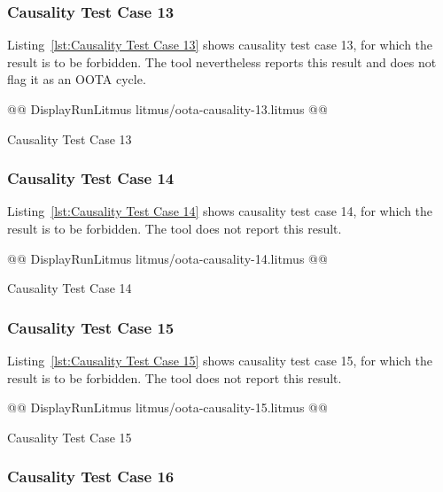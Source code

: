 \documentclass[10]{article}
\begin{document}
\subsubsection{Causality Test Case 13}
\label{app:Causality Test Case 13}

Listing~\ref{lst:Causality Test Case 13}
shows causality test case 13, for which the 
result is to be forbidden.
The  tool nevertheless reports this result and does not flag it as
an OOTA cycle.

\begin{listing}[tbp]
@@ DisplayRunLitmus litmus/oota-causality-13.litmus @@
\caption{Causality Test Case 13}
\label{lst:Causality Test Case 13}
\end{listing}

\subsubsection{Causality Test Case 14}
\label{app:Causality Test Case 14}

Listing~\ref{lst:Causality Test Case 14}
shows causality test case 14, for which the 
result is to be forbidden.
The  tool does not report this result.

\begin{listing}[tbp]
@@ DisplayRunLitmus litmus/oota-causality-14.litmus @@
\caption{Causality Test Case 14}
\label{lst:Causality Test Case 14}
\end{listing}

\subsubsection{Causality Test Case 15}
\label{app:Causality Test Case 15}

Listing~\ref{lst:Causality Test Case 15}
shows causality test case 15, for which the 
result is to be forbidden.
The  tool does not report this result.

\begin{listing}[tbp]
@@ DisplayRunLitmus litmus/oota-causality-15.litmus @@
\caption{Causality Test Case 15}
\label{lst:Causality Test Case 15}
\end{listing}

\subsubsection{Causality Test Case 16}
\label{app:Causality Test Case 16}
\end{document}
